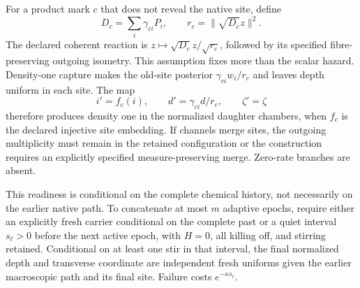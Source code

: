 \documentclass[11pt,oneside,openany]{book}
\theoremstyle{definition}
\theoremstyle{remark}\newtheorem{remark}[theorem]{Remark}
\begin{document}
For a product mark $c$ that does not reveal the native site, define
\[
 D_c=\sum_i\gamma_{ci}P_i,
 \qquad r_c=\|\sqrt{D_c}z\|^2.
\]
The declared coherent reaction is $z\mapsto\sqrt{D_c}z/\sqrt{r_c}$, followed by its specified fibre-preserving outgoing isometry. This assumption fixes more than the scalar hazard. Density-one capture makes the old-site posterior $\gamma_{ci}w_i/r_c$ and leaves depth uniform in each site. The map
\begin{equation}
 i'=f_c(i),\qquad d'=\gamma_{ci}d/r_c,\qquad\zeta'=\zeta
 \label{chamber:capturereset}
\end{equation}
therefore produces density one in the normalized daughter chambers, when $f_c$ is the declared injective site embedding. If channels merge sites, the outgoing multiplicity must remain in the retained configuration or the construction requires an explicitly specified measure-preserving merge. Zero-rate branches are absent.

This readiness is conditional on the complete chemical history, not necessarily on the earlier native path. To concatenate at most $m$ adaptive epochs, require either an explicitly fresh carrier conditional on the complete past or a quiet interval $s_\ell>0$ before the next active epoch, with $H=0$, all killing off, and stirring retained. Conditional on at least one stir in that interval, the final normalized depth and transverse coordinate are independent fresh uniforms given the earlier macroscopic path and its final site. Failure costs $e^{-\kappa s_\ell}$.
\end{document}
